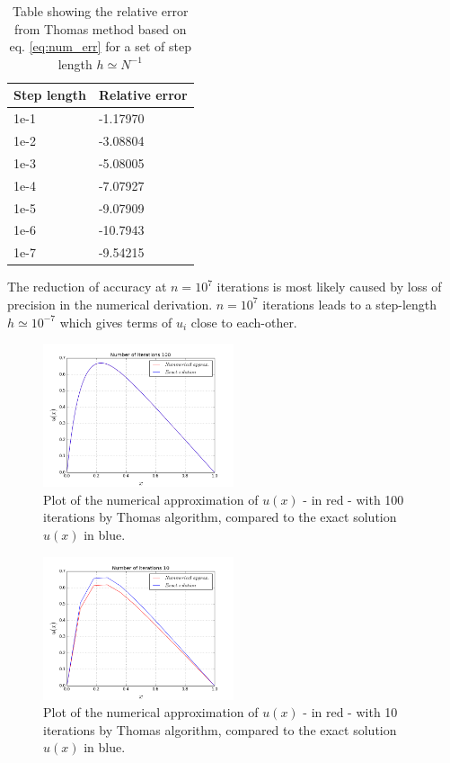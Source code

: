 \documentclass[twoside,twocolumn]{article}
\begin{document}
\begin{table}[htp]
\centering
\begin{tabular}{|l|l|} \hline
Step length& Relative error\\ \hline
1e-1 & -1.17970\\
1e-2 & -3.08804\\
1e-3 & -5.08005\\
1e-4 & -7.07927\\
1e-5 & -9.07909\\
1e-6 & -10.7943\\
1e-7 & -9.54215\\ \hline
\end{tabular}
\caption{Table showing the relative error from Thomas method based on eq. \ref{eq:num_err} for a set of step length $h\simeq N^{-1}$}\label{tbl:error}
\end{table}


The reduction of accuracy at $n=10^7$ iterations  is most likely caused by loss of precision in the numerical derivation. $n=10^7$ iterations leads to a step-length $h\simeq 10^{-7}$ which gives terms of $u_i$ close to each-other. %

\begin{figure}[htp]
\includegraphics[width=0.5\textwidth]{figures/b-run1e2.png} 
\caption{Plot of the numerical approximation of $u(x)$ - in red - with 100 iterations by Thomas algorithm, compared to the exact solution $u(x)$ in blue.} \label{fig:Thomas1E2}
\end{figure}

\begin{figure}[htp]
\includegraphics[width=0.5\textwidth]{figures/b-run10.png} 
\caption{Plot of the numerical approximation of $u(x)$ - in red - with 10 iterations by Thomas algorithm, compared to the exact solution $u(x)$ in blue.} \label{fig:Thomas10}
\end{figure}
\end{document}
